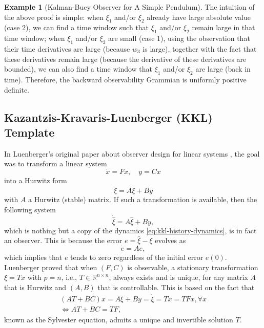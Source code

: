 \documentclass[
]{book}
\theoremstyle{definition}
\theoremstyle{definition}
\newtheorem{example}{Example}[chapter]
\theoremstyle{definition}
\theoremstyle{definition}
\theoremstyle{remark}
\begin{document}
\begin{example}[Kalman-Bucy Observer for A Simple Pendulum]
The intuition of the above proof is simple: when \(\xi_1\) and/or \(\xi_2\) already have large absolute value (case 2), we can find a time window such that \(\xi_1\) and/or \(\xi_2\) remain large in that time window; when \(\xi_1\) and/or \(\xi_2\) are small (case 1), using the observation that their time derivatives are large (because \(w_3\) is large), together with the fact that these derivatives remain large (because the derivative of these derivatives are bounded), we can also find a time window that \(\xi_1\) and/or \(\xi_2\) are large (back in time). Therefore, the backward observability Grammian is uniformly positive definite.

\end{example}

\hypertarget{kazantzis-kravaris-luenberger-kkl-template}{%
\subsection{Kazantzis-Kravaris-Luenberger (KKL) Template}\label{kazantzis-kravaris-luenberger-kkl-template}}

In Luenberger's original paper about observer design for linear systems \citep{luenberger64-observer}, the goal was to transform a linear system
\[
\dot{x} = F x, \quad y = C x
\]
into a Hurwitz form
\begin{equation}
\dot{\xi} = A \xi + B y
\label{eq:kkl-history-dynamics}
\end{equation}
with \(A\) a Hurwitz (stable) matrix. If such a transformation is available, then the following system
\[
\dot{\hat{\xi}} = A \hat{\xi} + B y,
\]
which is nothing but a copy of the dynamics \eqref{eq:kkl-history-dynamics}, is in fact an observer. This is because the error \(e = \hat{\xi} - \xi\) evolves as
\[
\dot{e} = A e,
\]
which implies that \(e\) tends to zero regardless of the initial error \(e(0)\). Luenberger proved that when \((F,C)\) is observable, a stationary transformation \(\xi = T x\) with \(p = n\), i.e., \(T \in \mathbb{R}^{n\times n}\), always exists and is unique, for any matrix \(A\) that is Hurwitz and \((A,B)\) that is controllable. This is based on the fact that
\begin{align}
(A T + B C) x =A \xi + B y =\dot{\xi} = T \dot{x} = TF x, \forall x \\
\Longleftrightarrow AT + BC = TF,
\end{align}
known as the Sylvester equation, admits a unique and invertible solution \(T\).
\end{document}
